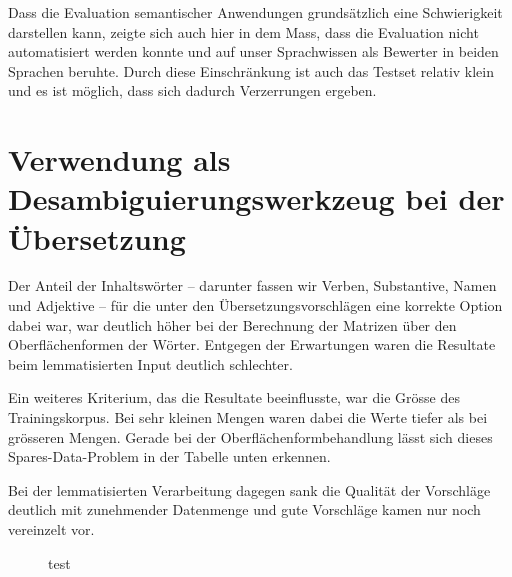 \documentclass[11pt,twoside,openright]{mpreport}
\begin{document}
Dass die Evaluation semantischer Anwendungen grundsätzlich eine Schwierigkeit darstellen kann, zeigte sich auch hier in dem Mass, dass die Evaluation nicht automatisiert werden konnte und auf unser Sprachwissen als Bewerter in beiden Sprachen beruhte. Durch diese Einschränkung ist auch das Testset relativ klein und es ist möglich, dass sich dadurch Verzerrungen ergeben.

\section{Verwendung als Desambiguierungswerkzeug bei der Übersetzung}

Der Anteil der Inhaltswörter -- darunter fassen wir Verben, Substantive, Namen und Adjektive -- für die unter den Übersetzungsvorschlägen eine korrekte Option dabei war, war deutlich höher bei der Berechnung der Matrizen über den Oberflächenformen der Wörter. Entgegen der Erwartungen waren die Resultate beim lemmatisierten Input deutlich schlechter.

Ein weiteres Kriterium, das die Resultate beeinflusste, war die Grösse des Trainingskorpus. Bei sehr kleinen Mengen waren dabei die Werte tiefer als bei grösseren Mengen. Gerade bei der Oberflächenformbehandlung lässt sich dieses Spares-Data-Problem in der Tabelle unten erkennen.

Bei der lemmatisierten Verarbeitung dagegen sank die Qualität der Vorschläge deutlich mit zunehmender Datenmenge und gute Vorschläge kamen nur noch vereinzelt vor.

\begin{figure}[H]
\hspace{-6cm}
\caption{test}
\end{figure}
\end{document}
